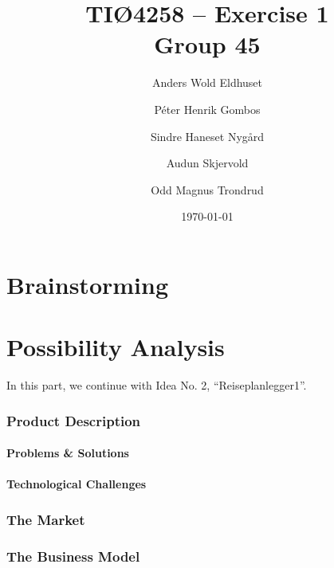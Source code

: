 \documentclass[a4paper]{article}
\title{TIØ4258 -- Exercise 1 \\ Group 45}
\author{
    Anders Wold Eldhuset \and
    Péter Henrik Gombos \and
    Sindre Haneset Nygård \and
    Audun Skjervold \and
    Odd Magnus Trondrud
}
\date{\today}
\begin{document}
    \maketitle
    \newpage
    \setcounter{secnumdepth}{2}

    \part{Brainstorming}
    	

    \part{Possibility Analysis}
    	In this part, we continue with Idea No. 2, ``Reiseplanlegger1''.
    	\section{Product Description}
    		\subsection{Problems \& Solutions}
	    		
    		\subsection{Technological Challenges}
	    			
	    \section{The Market} %
            

            

            

            

	    \section{The Business Model}
            
\end{document}
